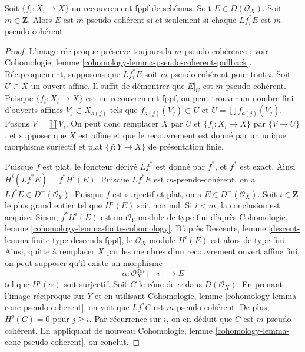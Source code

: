 \begin{lemma}
\label{lemma-pseudo-coherent-descends-fppf}
Soit $\{f_i : X_i \to X\}$ un recouvrement fppf de schémas. Soit
$E \in D(\mathcal{O}_X)$. Soit $m \in \mathbf{Z}$.
Alors $E$ est $m$-pseudo-cohérent si et seulement si chaque
$Lf_i^*E$ est $m$-pseudo-cohérent.
\end{lemma}

\begin{proof}
L'image réciproque préserve toujours la $m$-pseudo-cohérence ; voir
Cohomologie, lemme \ref{cohomology-lemma-pseudo-coherent-pullback}.
Réciproquement, supposons que $Lf_i^*E$ soit $m$-pseudo-cohérent pour tout $i$.
Soit $U \subset X$ un ouvert affine. Il suffit de démontrer que
$E|_U$ est $m$-pseudo-cohérent. Puisque $\{f_i : X_i \to X\}$ est un
recouvrement fppf, on peut trouver un nombre fini d'ouverts affines $V_j \subset X_{a(j)}$
tels que $f_{a(j)}(V_j) \subset U$ et $U = \bigcup f_{a(j)}(V_j)$.
Posons $V = \coprod V_i$.
On peut donc remplacer $X$ par $U$ et $\{f_i : X_i \to X\}$ par
$\{V \to U\}$, et supposer que $X$ est affine et que le recouvrement
est donné par un unique morphisme surjectif et plat $\{f : Y \to X\}$
de présentation finie.

\medskip\noindent
Puisque $f$ est plat, le foncteur dérivé $Lf^*$ est donné par $f^*$, et $f^*$
est exact. Ainsi $H^i(Lf^*E) = f^*H^i(E)$. Puisque $Lf^*E$ est $m$-pseudo-cohérent,
on a $Lf^*E \in D^-(\mathcal{O}_Y)$. Puisque $f$ est surjectif et plat,
on a $E \in D^-(\mathcal{O}_X)$. Soit $i \in \mathbf{Z}$ le plus grand
entier tel que $H^i(E)$ soit non nul. Si $i < m$, la conclusion est acquise. Sinon,
$f^*H^i(E)$ est un $\mathcal{O}_Y$-module de type fini d'après
Cohomologie, lemme \ref{cohomology-lemma-finite-cohomology}.
D'après Descente, lemme \ref{descent-lemma-finite-type-descends-fppf},
le $\mathcal{O}_X$-module $H^i(E)$ est alors de type fini.
Ainsi, quitte à remplacer $X$ par les membres d'un recouvrement ouvert affine fini,
on peut supposer qu'il existe un morphisme
$$
\alpha : \mathcal{O}_X^{\oplus n}[-i] \longrightarrow E
$$
tel que $H^i(\alpha)$ soit surjectif. Soit $C$ le cône de $\alpha$
dans $D(\mathcal{O}_X)$. En prenant l'image réciproque sur $Y$ et en utilisant
Cohomologie, lemme \ref{cohomology-lemma-cone-pseudo-coherent},
on voit que $Lf^*C$ est $m$-pseudo-cohérent. De plus, $H^j(C) = 0$
pour $j \geq i$. Par récurrence sur $i$, on en déduit que $C$ est
$m$-pseudo-cohérent. En appliquant de nouveau
Cohomologie, lemme \ref{cohomology-lemma-cone-pseudo-coherent},
on conclut.
\end{proof}

